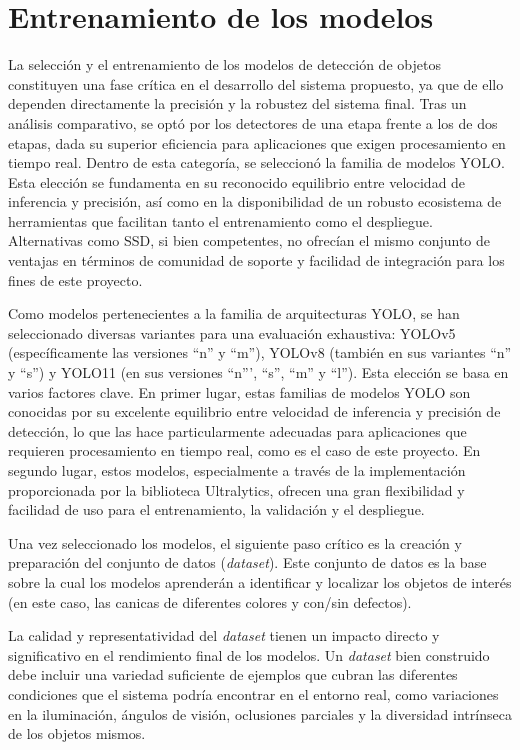 \documentclass[11pt,spanish,listoffigures,listoftables]{tfgetsinf}
\begin{document}
\section{Entrenamiento de los modelos} \label{sec:entrenamiento_modelo}

La selección y el entrenamiento de los modelos de detección de objetos constituyen una fase crítica en el desarrollo del sistema propuesto, ya que de ello dependen directamente la precisión y la robustez del sistema final.
Tras un análisis comparativo, se optó por los detectores de una etapa frente a los de dos etapas, dada su superior eficiencia para aplicaciones que exigen procesamiento en tiempo real. Dentro de esta categoría, se seleccionó la familia de modelos YOLO. Esta elección se fundamenta en su reconocido equilibrio entre velocidad de inferencia y precisión, así como en la disponibilidad de un robusto ecosistema de herramientas que facilitan tanto el entrenamiento como el despliegue. Alternativas como SSD\cite{Liu_2016}, si bien competentes, no ofrecían el mismo conjunto de ventajas en términos de comunidad de soporte y facilidad de integración para los fines de este proyecto.

Como modelos pertenecientes a la familia de arquitecturas YOLO, se han seleccionado diversas variantes para una evaluación exhaustiva: YOLOv5 (específicamente las versiones ``n'' y ``m''), YOLOv8 (también en sus variantes ``n'' y ``s'') y YOLO11 (en sus versiones ``n''', ``s'', ``m'' y ``l''). Esta elección se basa en varios factores clave. En primer lugar, estas familias de modelos YOLO son conocidas por su excelente equilibrio entre velocidad de inferencia y precisión de detección, lo que las hace particularmente adecuadas para aplicaciones que requieren procesamiento en tiempo real, como es el caso de este proyecto. En segundo lugar, estos modelos, especialmente a través de la implementación proporcionada por la biblioteca Ultralytics, ofrecen una gran flexibilidad y facilidad de uso para el entrenamiento, la validación y el despliegue.

Una vez seleccionado los modelos, el siguiente paso crítico es la creación y preparación del conjunto de datos (\textit{dataset}). Este conjunto de datos es la base sobre la cual los modelos aprenderán a identificar y localizar los objetos de interés (en este caso, las canicas de diferentes colores y con/sin defectos). 

La calidad y representatividad del \textit{dataset} tienen un impacto directo y significativo en el rendimiento final de los modelos. Un \textit{dataset} bien construido debe incluir una variedad suficiente de ejemplos que cubran las diferentes condiciones que el sistema podría encontrar en el entorno real, como variaciones en la iluminación, ángulos de visión, oclusiones parciales y la diversidad intrínseca de los objetos mismos.
\end{document}
